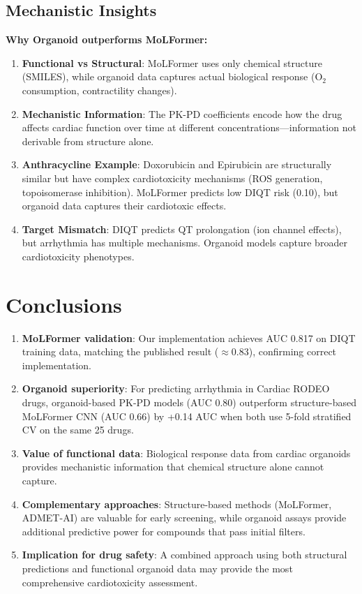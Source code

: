 \documentclass[11pt]{article}
\begin{document}
\subsection{Mechanistic Insights}

\textbf{Why Organoid outperforms MoLFormer:}
\begin{enumerate}
    \item \textbf{Functional vs Structural}: MoLFormer uses only chemical structure (SMILES), while organoid data captures actual biological response (O$_2$ consumption, contractility changes).

    \item \textbf{Mechanistic Information}: The PK-PD coefficients encode how the drug affects cardiac function over time at different concentrations---information not derivable from structure alone.

    \item \textbf{Anthracycline Example}: Doxorubicin and Epirubicin are structurally similar but have complex cardiotoxicity mechanisms (ROS generation, topoisomerase inhibition). MoLFormer predicts low DIQT risk (0.10), but organoid data captures their cardiotoxic effects.

    \item \textbf{Target Mismatch}: DIQT predicts QT prolongation (ion channel effects), but arrhythmia has multiple mechanisms. Organoid models capture broader cardiotoxicity phenotypes.
\end{enumerate}


\section{Conclusions}

\begin{enumerate}
    \item \textbf{MoLFormer validation}: Our implementation achieves AUC 0.817 on DIQT training data, matching the published result ($\approx$0.83), confirming correct implementation.

    \item \textbf{Organoid superiority}: For predicting arrhythmia in Cardiac RODEO drugs, organoid-based PK-PD models (AUC 0.80) outperform structure-based MoLFormer CNN (AUC 0.66) by +0.14 AUC when both use 5-fold stratified CV on the same 25 drugs.

    \item \textbf{Value of functional data}: Biological response data from cardiac organoids provides mechanistic information that chemical structure alone cannot capture.

    \item \textbf{Complementary approaches}: Structure-based methods (MoLFormer, ADMET-AI) are valuable for early screening, while organoid assays provide additional predictive power for compounds that pass initial filters.

    \item \textbf{Implication for drug safety}: A combined approach using both structural predictions and functional organoid data may provide the most comprehensive cardiotoxicity assessment.
\end{enumerate}
\end{document}
